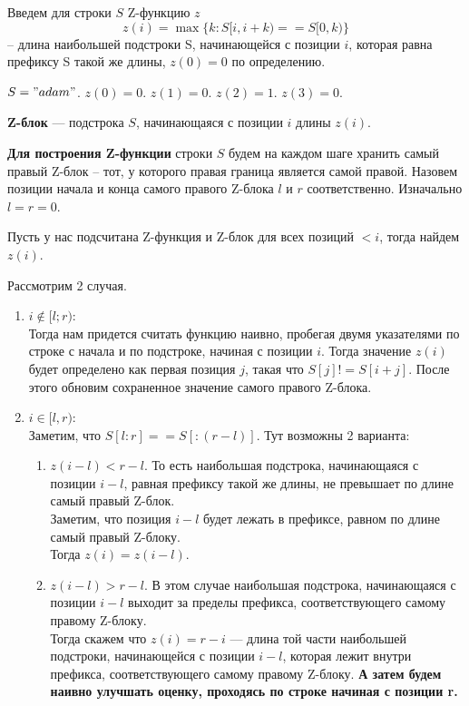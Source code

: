 Введем для строки $S$ Z-функцию $z$ 
\[
	z(i) = \max \{k: S[i, i + k) == S[0, k)\}
\]
-- длина наибольшей подстроки S, начинающейся с позиции $i$, которая равна префиксу S такой же длины, $z(0) = 0$ по определению.

\begin{example}
	$S = "adam"$. 
	$z(0) = 0.$
	$z(1) = 0.$
	$z(2) = 1.$ 
	$z(3) = 0.$
\end{example}

\begin{Def}
	\textbf{Z-блок} --- подстрока $S$, начинающаяся с позиции  $i$ длины  $z(i)$.
\end{Def}

\textbf{Для построения Z-функции} строки $S$ будем на каждом шаге хранить самый правый  Z-блок -- тот, у которого правая граница является самой правой.
Назовем позиции начала и конца самого правого Z-блока $l$ и  $r$ соответственно. Изначально $l = r = 0$. 

Пусть у нас подсчитана Z-функция и Z-блок для всех позиций $< i$, тогда найдем  $z(i)$.

Рассмотрим 2 случая. 
\begin{enumerate}
	\item \underline{$i \notin [l; r)$}: \\
		Тогда нам придется считать функцию наивно, пробегая двумя указателями по строке с начала и по подстроке, начиная с позиции $i$. Тогда значение $z(i)$ будет определено как первая позиция $j$, такая что  $S[j] != S[i + j]$.
		После этого обновим сохраненное значение самого правого Z-блока.
	\item \underline{$i \in [l, r)$}: \\
        Заметим, что $S[l:r] == S[:(r - l)].$
		Тут возможны 2 варианта:
		\begin{enumerate}
			\item \underline{$z(i - l) < r - l$}. То есть наибольшая подстрока, начинающаяся с позиции $i - l$, равная префиксу такой же длины, не превышает по длине самый правый Z-блок. \\
				Заметим, что позиция $i - l$ будет лежать в префиксе, равном по длине самый правый Z-блоку. \\
				Тогда $z(i) = z(i - l)$. \\
		\item \underline{$z(i - l) > r - l$}. В этом случае наибольшая подстрока, начинающаяся с позиции $i - l$ выходит за пределы префикса, соответствующего самому правому Z-блоку. \\
				Тогда скажем  что $z(i) = r - i$ --- длина той части наибольшей подстроки, начинающейся с позиции  $i - l$, которая лежит внутри префикса, соответствующего самому правому Z-блоку. \textbf{А затем будем наивно улучшать оценку, проходясь по строке начиная с позиции r.}
		\end{enumerate}
\end{enumerate}


